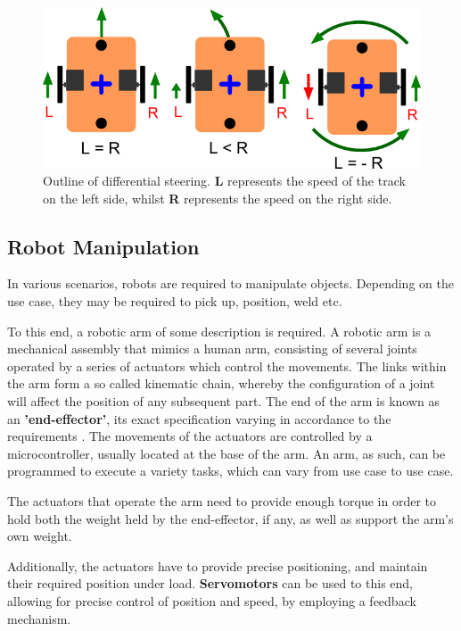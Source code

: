 \documentclass[12p,a4paper]{report}
\begin{document}
\begin{figure}[H]
\begin{center}
\includegraphics[scale=0.6]{differential-steering}
\caption{Outline of differential steering. \textbf{L} represents the speed of the track on the left side, whilst \textbf{R} represents the speed on the right side. \cite{differential-steering}} 
\label{fig:differential-steering}
\end{center}
\end{figure}
\newpage

\subsection{Robot Manipulation}

In various scenarios, robots are required to manipulate objects. Depending on the use case, they may be required to pick up, position, weld etc.

To this end, a robotic arm of some description is required. A robotic arm is a mechanical assembly that mimics a human arm, consisting of several joints operated by a series of actuators which control the movements. The links within the arm form a so called kinematic chain, whereby the configuration of a joint will affect the position of any subsequent part. The end of the arm is known as an \textbf{'end-effector'}, its exact specification varying in accordance to the requirements \cite{endeffector}. The movements of the actuators are controlled by a microcontroller, usually located at the base of the arm. An arm, as such, can be programmed to execute a variety tasks, which can vary from use case to use case.

The actuators that operate the arm need to provide enough torque in order to hold both the weight held by the end-effector, if any, as well as support the arm's own weight.

Additionally, the actuators have to provide precise positioning, and maintain their required position under load. \textbf{Servomotors} can be used to this end, allowing for precise control of position and speed, by employing a feedback mechanism.  
\end{document}
